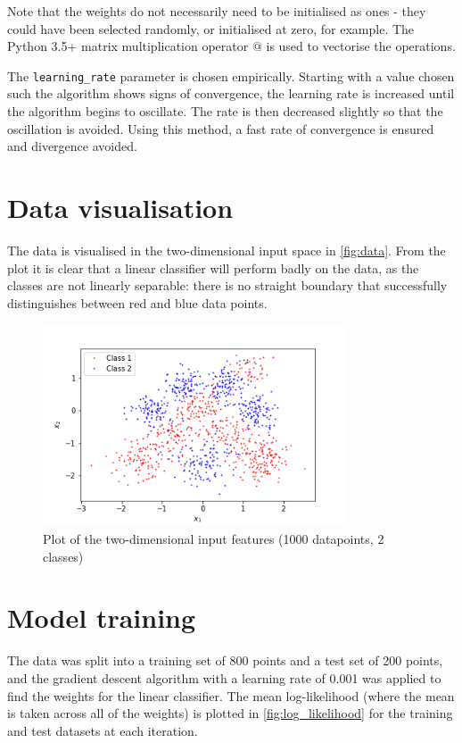 \documentclass[a4paper]{article}
\begin{document}
    Note that the weights do not necessarily need to be initialised as ones - they could have been selected randomly, or
    initialised at zero, for example. The Python 3.5+ matrix multiplication operator $@$ is used to vectorise the
    operations.

    The \verb`learning_rate` parameter is chosen empirically. Starting with a value chosen such the algorithm shows signs
    of convergence, the learning rate is increased until the algorithm begins to oscillate. The rate is then decreased
    slightly so that the oscillation is avoided. Using this method, a fast rate of convergence is ensured and divergence
    avoided.

    \section{Data visualisation}
    The data is visualised in the two-dimensional input space in \autoref{fig:data}. From the plot it is clear that a
    linear classifier will perform badly on the data, as the classes are not linearly separable: there is no straight
    boundary that successfully distinguishes between red and blue data points.

    \begin{figure}[h]
        \label{fig:data}
        \centering
        \includegraphics[width=0.8\textwidth]{plots/data.png}
        \caption{Plot of the two-dimensional input features (1000 datapoints, 2 classes)}
    \end{figure}

    \section{Model training}
    The data was split into a training set of 800 points and a test set of 200 points, and the gradient descent
    algorithm with a learning rate of 0.001 was applied to find the weights for the linear classifier. The mean
    log-likelihood (where the mean is taken across all of the weights) is plotted in \autoref{fig:log_likelihood} for
    the training and test datasets at each iteration.
\end{document}

